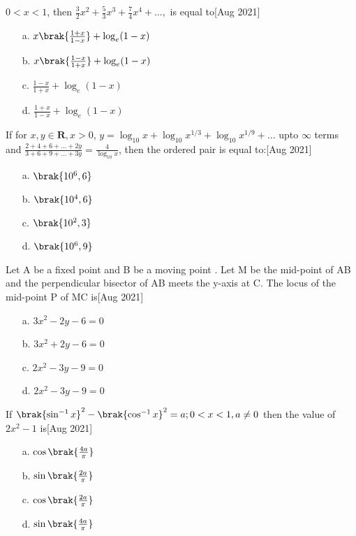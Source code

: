 \iffalse
\title{August:2021}
\author{AI24BTECH11008}
\section{mcq-single}
\fi
\item  $0<x<1$, then $\frac{3}{2}x^2+\frac{5}{3}x^3+\frac{7}{4}x^4+\ldots,$ is equal to\hfill  [Aug 2021]
\begin{enumerate}
    \item [a.] $x\brak{\frac{1+x}{1-x}}+\log _e (1-x)$
    \item [b.]  $x\brak{\frac{1-x}{1+x}}+\log _e (1-x)$
    \item [c.]  $\frac{1-x}{1+x}+\log _e (1-x)$
    \item [d.]  $\frac{1+x}{1-x}+\log _e (1-x)$
\end{enumerate}
\item If for $x,y \in \mathbf{R},x>0$, $y=\log _{10}x+\log _{10}x^{1/3}+\log _{10}x^{1/9}+\ldots$ upto $\infty$ terms and $\frac{2+4+6+\ldots+2y}{3+6+9+\ldots+3y} = \frac{4}{\log _{10}x}$, then the ordered pair  is equal to:\hfill  [Aug 2021]
\begin{enumerate}
    \item [a.] $\brak{10^6,6}$
    \item [b.] $\brak{10^4,6}$
    \item [c.] $\brak{10^2,3}$
    \item [d.] $\brak{10^6,9}$
\end{enumerate}
\item Let A be a fixed point  and B be a moving
point . Let M be the mid-point of AB and the
perpendicular bisector of AB meets the y-axis at C.
The locus of the mid-point P of MC is\hfill  [Aug 2021]
\begin{enumerate}
    \item [a.] $3x^2-2y-6=0$
    \item [b.] $3x^2+2y-6=0$
    \item [c.] $2x^2-3y-9=0$
    \item [d.] $2x^2-3y-9=0$
\end{enumerate}
\item If $\brak{\sin ^{-1} x}^2-\brak{\cos ^{-1} x}^2=a; 0<x<1, a\neq 0$ then the value of $2x^2-1$ is\hfill  [Aug 2021]
 \begin{enumerate}
    \item [a.] $\cos\brak{\frac{4a}{\pi}}$
    \item [b.] $\sin\brak{\frac{2a}{\pi}}$
    \item [c.] $\cos\brak{\frac{2a}{\pi}}$
    \item [d.] $\sin\brak{\frac{4a}{\pi}}$
\end{enumerate}
